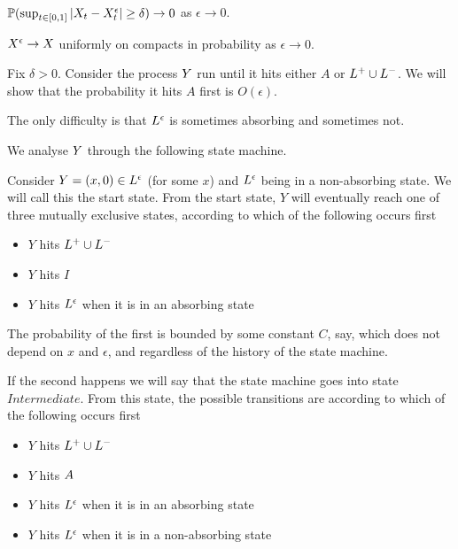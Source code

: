 {\begin{lemma}
  $\mathbb{P}(\sup_{t \in [0,1]} |X_t - X^{\epsilon}_t | \ge \delta) \to
  0$ as $\epsilon \to 0$.
\end{lemma}

\begin{lemma}
  $X^{\epsilon} \to X$ uniformly on compacts in probability as
  $\epsilon \to 0$.
\end{lemma}

Fix $\delta > 0$.  Consider the process $Y$ run until it hits
either $A$ or $L^+ \cup L^-$.  We will show that the probability it
hits $A$ first is $O(\epsilon)$.

The only difficulty is that $L^\epsilon$ is sometimes absorbing and
sometimes not.

We analyse $Y$ through the following state machine.

Consider $Y = (x,0) \in L^\epsilon$ (for some $x$) and $L^\epsilon$ being in
a non-absorbing state.  We will call this the start state.  From the
start state, $Y$ will eventually reach one of three mutually exclusive
states, according to which of the following occurs first

\newcommand{\intermediatelines}{I}

\begin{itemize}
\item $Y$ hits $L^+ \cup L^-$
\item $Y$ hits $\intermediatelines$
\item $Y$ hits $L^\epsilon$ when it is in an absorbing state
\end{itemize}

The probability of the first is bounded by some constant $C$, say,
which does not depend on $x$ and $\epsilon$, and regardless of the
history of the state machine.

\newcommand{\stateintermediate}{Intermediate}

If the second happens we will say that the state machine goes into
state $\stateintermediate$.  From this state, the possible transitions
are according to which of the following occurs first

\begin{itemize}
\item $Y$ hits $L^+ \cup L^-$
\item $Y$ hits $A$
\item $Y$ hits $L^\epsilon$ when it is in an absorbing state
\item $Y$ hits $L^\epsilon$ when it is in a non-absorbing state
\end{itemize}

}

